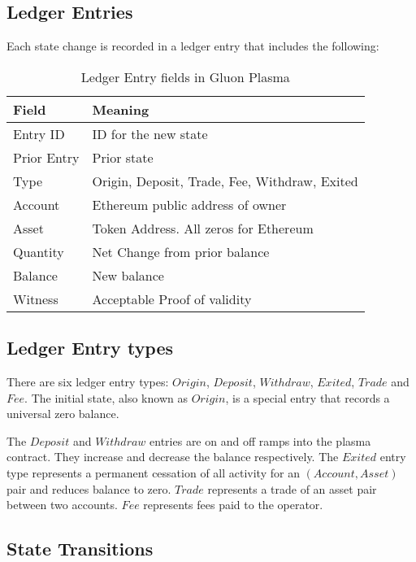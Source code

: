 \documentclass[12pt,a4paper]{article}
\begin{document}
\subsection{Ledger Entries}
Each state change is recorded in a ledger entry that includes the following:

\begin{table}[ht]
\caption{Ledger Entry fields in Gluon Plasma}
\centering
\begin{tabular}{|l|l|}
\hline
\bfseries    Field & \bfseries Meaning \\
\hline
    Entry ID &ID for the new state \\
    Prior Entry	& Prior state \\
    Type &	Origin, Deposit, Trade, Fee, Withdraw, Exited \\
    Account &	Ethereum public address of owner \\
    Asset &	Token Address. All zeros for Ethereum \\
    Quantity &	Net Change from prior balance \\
    Balance	 & New balance \\
    Witness	& Acceptable Proof of validity \\
\hline
\end{tabular}
\end{table}

\subsection{Ledger Entry types}
There are six ledger entry types: $Origin$, $Deposit$, $Withdraw$, $Exited$, $Trade$ and $Fee$.
The initial state, also known as $Origin$, is a special entry that records a universal zero balance. 

The $Deposit$ and $Withdraw$ entries are on and off ramps into the plasma contract. They increase and decrease the balance respectively. The $Exited$ entry type represents a permanent cessation of all activity for an \((Account, Asset)\) pair and reduces balance to zero. $Trade$ represents a trade of an asset pair between two accounts. $Fee$ represents fees paid to the operator.

\subsection{State Transitions}
\end{document}
